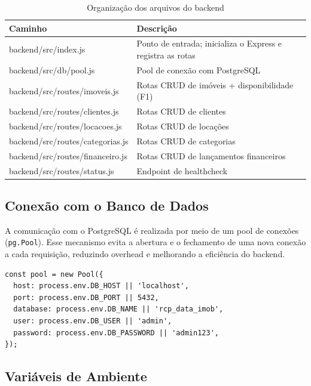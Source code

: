\documentclass[12pt, a4paper]{article}
\newcommand{\thead}[1]{\cellcolor{tableheader}\color{white}\bfseries #1}
\newcommand{\talt}{\rowcolor{tablerowalt}}
\begin{document}
\begin{table}[H]
\centering
\begin{tabularx}{\textwidth}{|l|X|}
\hline
\thead{Caminho} & \thead{Descrição} \\
\hline
backend/src/index.js            & Ponto de entrada; inicializa o Express e registra as rotas \\
\talt backend/src/db/pool.js         & Pool de conexão com PostgreSQL \\
backend/src/routes/imoveis.js   & Rotas CRUD de imóveis + disponibilidade (F1) \\
\talt backend/src/routes/clientes.js & Rotas CRUD de clientes \\
backend/src/routes/locacoes.js  & Rotas CRUD de locações \\
\talt backend/src/routes/categorias.js & Rotas CRUD de categorias \\
backend/src/routes/financeiro.js & Rotas CRUD de lançamentos financeiros \\
\talt backend/src/routes/status.js   & Endpoint de healthcheck \\
\hline
\end{tabularx}
\caption{Organização dos arquivos do backend}
\end{table}

\subsection{Conexão com o Banco de Dados}

A comunicação com o PostgreSQL é realizada por meio de um pool de conexões (\texttt{pg.Pool}). Esse mecanismo evita a abertura e o fechamento de uma nova conexão a cada requisição, reduzindo overhead e melhorando a eficiência do backend.

\begin{lstlisting}[language=JavaScript2]
const pool = new Pool({
  host: process.env.DB_HOST || 'localhost',
  port: process.env.DB_PORT || 5432,
  database: process.env.DB_NAME || 'rcp_data_imob',
  user: process.env.DB_USER || 'admin',
  password: process.env.DB_PASSWORD || 'admin123',
});
\end{lstlisting}

\subsection{Variáveis de Ambiente}
\end{document}
